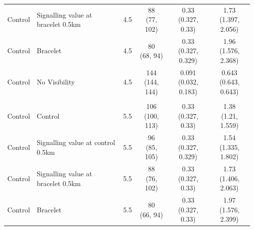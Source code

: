 \begin{tabular}{llcccc}
\hspace{1em}Control & Signalling value at bracelet 0.5km & 4.5 & \makecell[c]{88\\(77, 102)} & \makecell[c]{0.33\\(0.327, 0.33)} & \makecell[c]{1.73\\(1.397, 2.056)}\\
\hspace{1em}Control & Bracelet & 4.5 & \makecell[c]{80\\(68, 94)} & \makecell[c]{0.33\\(0.327, 0.329)} & \makecell[c]{1.96\\(1.576, 2.368)}\\
\hspace{1em}Control & No Visibility & 4.5 & \makecell[c]{144\\(144, 144)} & \makecell[c]{0.091\\(0.032, 0.183)} & \makecell[c]{0.643\\(0.643, 0.643)}\\
\addlinespace[0.3em]
\hline
\multicolumn{6}{l}{\textit{\textbf{Panel E: Policymaker allocation, 5.5km}}}\\
\hline
\hspace{1em}Control & Control & 5.5 & \makecell[c]{106\\(100, 113)} & \makecell[c]{0.33\\(0.327, 0.33)} & \makecell[c]{1.38\\(1.21, 1.559)}\\
\hspace{1em}Control & Signalling value at control 0.5km & 5.5 & \makecell[c]{96\\(85, 105)} & \makecell[c]{0.33\\(0.327, 0.329)} & \makecell[c]{1.54\\(1.335, 1.802)}\\
\hspace{1em}Control & Signalling value at bracelet 0.5km & 5.5 & \makecell[c]{88\\(76, 102)} & \makecell[c]{0.33\\(0.327, 0.33)} & \makecell[c]{1.73\\(1.406, 2.063)}\\
\hspace{1em}Control & Bracelet & 5.5 & \makecell[c]{80\\(66, 94)} & \makecell[c]{0.33\\(0.327, 0.33)} & \makecell[c]{1.97\\(1.576, 2.399)}\\

\end{tabular}
